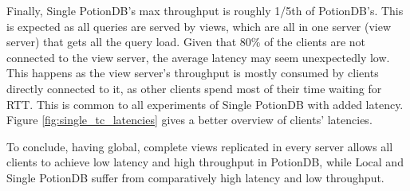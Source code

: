 \documentclass[sigconf, nonacm]{acmart}
\begin{document}
Finally, Single PotionDB's max throughput is roughly 1/5th of PotionDB's.
This is expected as all queries are served by views, which are all in one server (view server) that gets all the query load.
Given that 80\% of the clients are not connected to the view server, the average latency may seem unexpectedly low.
This happens as the view server's throughput is mostly consumed by clients directly connected to it, as other clients spend most of their time waiting for RTT.
This is common to all experiments of Single PotionDB with added latency.
Figure \ref{fig:single_tc_latencies} gives a better overview of clients' latencies.

To conclude, having global, complete views replicated in every server allows all clients to achieve low latency and high throughput in PotionDB, while Local and Single PotionDB suffer from comparatively high latency and low throughput.

\end{document}
